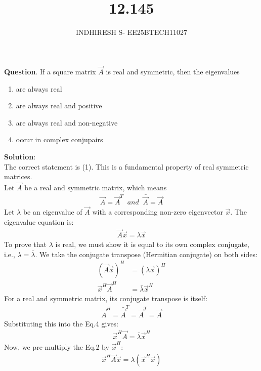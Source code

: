 \documentclass[journal]{IEEEtran}
\theoremstyle{remark}
\begin{document}

\onecolumn

\title{12.145}
\author{INDHIRESH S- EE25BTECH11027}
\maketitle


\renewcommand{\thefigure}{\theenumi}
\renewcommand{\thetable}{\theenumi}

\textbf{Question}. If a square matrix $\Vec{A}$ is real and symmetric, then the eigenvalues
\begin{enumerate}
    \item are always real
    \item  are always real and positive
    \item are always real and non-negative
    \item occur in complex conjupairs
\end{enumerate}
\textbf{Solution}:\\
The correct statement is (1). This is a fundamental property of real symmetric matrices.\\
Let $\Vec{A}$ be a real and symmetric matrix, which means
\begin{align}
\Vec{A} = \Vec{A}^T\;\; and\;\; \bar{\Vec{A}} = \Vec{A}
\end{align}
Let $\lambda$ be an eigenvalue of $\Vec{A}$ with a corresponding non-zero eigenvector $\Vec{x}$. The eigenvalue equation is:
\begin{align}
    \Vec{A}\Vec{x} = \lambda\Vec{x}
\end{align}
To prove that $\lambda$ is real, we must show it is equal to its own complex conjugate, i.e., $\lambda = \bar{\lambda}$.
We take the conjugate transpose (Hermitian conjugate) on both sides:
\begin{align}
    (\Vec{A}\Vec{x})^H &= (\lambda\Vec{x})^H \\
    \Vec{x}^H \Vec{A}^H &= \bar{\lambda}\Vec{x}^H
\end{align}
For a real and symmetric matrix, its conjugate transpose is itself:
\begin{align}
    \Vec{A}^H = \bar{\Vec{A}}^T = \Vec{A}^T = \Vec{A}
\end{align}
Substituting this into the Eq.4 gives:
\begin{align}
    \Vec{x}^H \Vec{A} = \bar{\lambda}\Vec{x}^H \label{eq:conj}
\end{align}
Now, we pre-multiply the Eq.2 by $\Vec{x}^H$:
\begin{align}
    \Vec{x}^H \Vec{A}\Vec{x} = \lambda(\Vec{x}^H\Vec{x}) \label{eq:pre}
\end{align}
\end{document}
